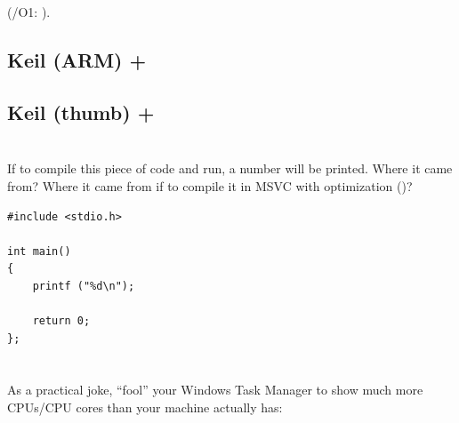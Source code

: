 (/O1: ).



\subsection{Keil (ARM) + \Othree}



\subsection{Keil (thumb) + \Othree}



\section{}

{If to compile this piece of code and run, a number will be printed. Where it came from?
Where it came from if to compile it in MSVC with optimization (\Ox)?}

\begin{lstlisting}
#include <stdio.h>

int main()
{
	printf ("%d\n");

	return 0;
};
\end{lstlisting}

\section{}

{As a practical joke, ``fool'' your Windows Task Manager 
to show much more CPUs/CPU cores than your machine actually has}:

